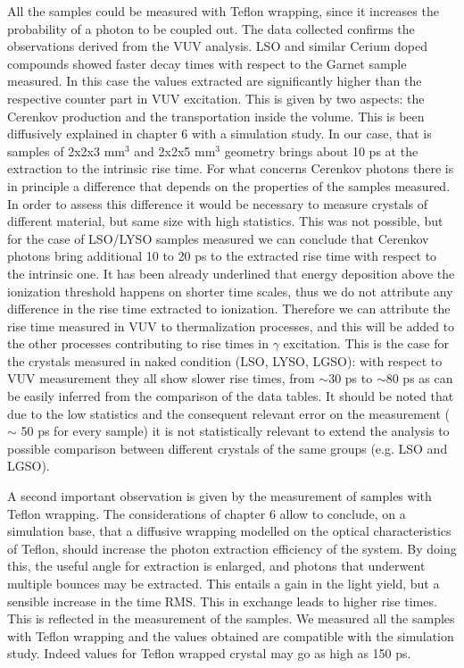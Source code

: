 All the samples could be measured with Teflon wrapping, since it increases the probability of a photon to be coupled out.
The data collected confirms the observations derived from the VUV analysis. LSO and similar Cerium doped compounds showed faster decay times with respect to the Garnet sample measured.
In this case the values extracted are significantly higher than the respective counter part in VUV excitation.
This is given by two aspects: the Cerenkov production and the transportation inside the volume. This is been diffusively explained in chapter 6 with a simulation study.
In our case, that is samples of 2x2x3 mm$^{3}$ and 2x2x5 mm$^{3}$ geometry brings about 10 ps at the extraction to the intrinsic rise time.
For what concerns Cerenkov photons there is in principle a difference that depends on the properties of the samples measured. In order to assess this difference it would be necessary to measure crystals of different material, but same size with high statistics. This was not possible, but for the case of LSO/LYSO samples measured we can conclude that Cerenkov photons bring additional 10 to 20 ps to the extracted rise time with respect to the intrinsic one.
It has been already underlined that energy deposition above the ionization threshold happens on shorter time scales, thus we do not attribute any difference in the rise time extracted to ionization. Therefore we can attribute the rise time measured in VUV to thermalization processes, and this will be added to the other processes contributing to rise times in $\gamma$ excitation.
This is the case for the crystals measured in naked condition (LSO, LYSO, LGSO): with respect to VUV measurement they all show slower rise times, from $\sim$30 ps to $\sim$80 ps as can be easily inferred from the comparison of the data tables.
It should be noted that due to the low statistics and the consequent relevant error on the measurement ($\sim$ 50 ps for every sample) it is not statistically relevant to extend the analysis to possible comparison between different crystals of the same groups (e.g. LSO and LGSO).

A second important observation is given by the measurement of samples with Teflon wrapping.
The considerations of chapter 6 allow to conclude, on a  simulation base, that a diffusive wrapping modelled on the optical characteristics of Teflon, should increase the photon extraction efficiency of the system. By doing this, the useful angle for extraction is enlarged, and photons that underwent multiple bounces may be extracted. This entails a gain in the light yield, but a sensible increase in the time RMS. This in exchange leads to higher rise times.
This is reflected in the measurement of the samples. We measured all the samples with Teflon wrapping and the values obtained are compatible with the simulation study. Indeed values for Teflon wrapped crystal may go as high as 150 ps.

